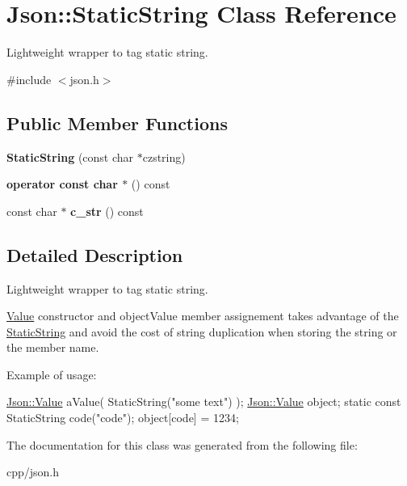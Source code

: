 \hypertarget{class_json_1_1_static_string}{}\section{Json\+:\+:Static\+String Class Reference}
\label{class_json_1_1_static_string}


Lightweight wrapper to tag static string.  




{\ttfamily \#include $<$json.\+h$>$}

\subsection*{Public Member Functions}
\begin{DoxyCompactItemize}
\item 
\mbox{\label{class_json_1_1_static_string_afb6baf1ec078ce76f0b0f9b39d19437f}} 
{\bfseries Static\+String} (const char $\ast$czstring)
\item 
\mbox{\label{class_json_1_1_static_string_a256a6cc0c630aef670848a0f11707b62}} 
{\bfseries operator const char $\ast$} () const
\item 
\mbox{\label{class_json_1_1_static_string_ad6be703d432d108623bb0aa06b0b90ca}} 
const char $\ast$ {\bfseries c\+\_\+str} () const
\end{DoxyCompactItemize}


\subsection{Detailed Description}
Lightweight wrapper to tag static string. 

\hyperlink{class_json_1_1_value}{Value} constructor and object\+Value member assignement takes advantage of the \hyperlink{class_json_1_1_static_string}{Static\+String} and avoid the cost of string duplication when storing the string or the member name.

Example of usage\+: 
\begin{DoxyCode}
\hyperlink{class_json_1_1_value}{Json::Value} aValue( StaticString(\textcolor{stringliteral}{"some text"}) );
\hyperlink{class_json_1_1_value}{Json::Value} object;
\textcolor{keyword}{static} \textcolor{keyword}{const} StaticString code(\textcolor{stringliteral}{"code"});
\textcolor{keywordtype}{object}[code] = 1234;
\end{DoxyCode}
 

The documentation for this class was generated from the following file\+:\begin{DoxyCompactItemize}
\item 
cpp/json.\+h\end{DoxyCompactItemize}
